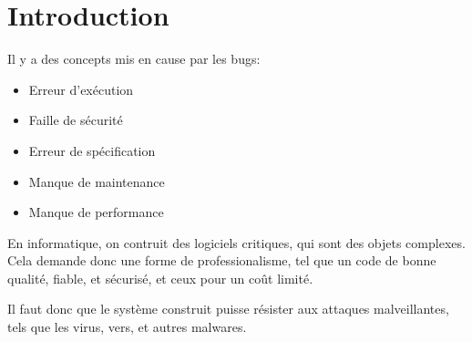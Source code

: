 \section{Introduction}
Il y a des concepts mis en cause par les bugs:
\begin{itemize}
	\item Erreur d'exécution
	\item Faille de sécurité
	\item Erreur de spécification
	\item Manque de maintenance
	\item Manque de performance
\end{itemize}

En informatique, on contruit des logiciels critiques, qui sont des objets complexes. Cela demande donc une forme de
professionalisme, tel que un code de bonne qualité, fiable, et sécurisé, et ceux pour un coût limité.

Il faut donc que le système construit puisse résister aux attaques malveillantes, tels que les virus, vers, et autres
malwares.
